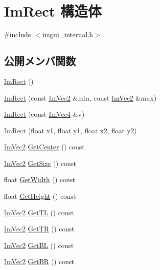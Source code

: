 \hypertarget{struct_im_rect}{}\section{Im\+Rect 構造体}
\label{struct_im_rect}


{\ttfamily \#include $<$imgui\+\_\+internal.\+h$>$}

\subsection*{公開メンバ関数}
\begin{DoxyCompactItemize}
\item 
\mbox{\hyperlink{struct_im_rect_a57399f36758ed3eb1eb762143401ff54}{Im\+Rect}} ()
\item 
\mbox{\hyperlink{struct_im_rect_a2f0ff273434bfd9d22bb699fd7a63a1f}{Im\+Rect}} (const \mbox{\hyperlink{struct_im_vec2}{Im\+Vec2}} \&min, const \mbox{\hyperlink{struct_im_vec2}{Im\+Vec2}} \&max)
\item 
\mbox{\hyperlink{struct_im_rect_adfe8d43381f9af8a3e3ea32a3821ab84}{Im\+Rect}} (const \mbox{\hyperlink{struct_im_vec4}{Im\+Vec4}} \&v)
\item 
\mbox{\hyperlink{struct_im_rect_a4cd168f1ae088e15db64b95b880f8933}{Im\+Rect}} (float x1, float y1, float x2, float y2)
\item 
\mbox{\hyperlink{struct_im_vec2}{Im\+Vec2}} \mbox{\hyperlink{struct_im_rect_aae13f8003184fd84f29d27c3c074cf43}{Get\+Center}} () const
\item 
\mbox{\hyperlink{struct_im_vec2}{Im\+Vec2}} \mbox{\hyperlink{struct_im_rect_ae459d9c50003058cfb34519a571aaf33}{Get\+Size}} () const
\item 
float \mbox{\hyperlink{struct_im_rect_afa75cb8491f20901c96166d17dcddac4}{Get\+Width}} () const
\item 
float \mbox{\hyperlink{struct_im_rect_a748d8ae9cb26508951ec6e2f2df0625b}{Get\+Height}} () const
\item 
\mbox{\hyperlink{struct_im_vec2}{Im\+Vec2}} \mbox{\hyperlink{struct_im_rect_a1d4d972329722b51dca4499cb5931b4b}{Get\+TL}} () const
\item 
\mbox{\hyperlink{struct_im_vec2}{Im\+Vec2}} \mbox{\hyperlink{struct_im_rect_acae90248a96be4acf1524071fca1c3f3}{Get\+TR}} () const
\item 
\mbox{\hyperlink{struct_im_vec2}{Im\+Vec2}} \mbox{\hyperlink{struct_im_rect_a59d9751bc7be6745dddf5b83b9155669}{Get\+BL}} () const
\item 
\mbox{\hyperlink{struct_im_vec2}{Im\+Vec2}} \mbox{\hyperlink{struct_im_rect_ad2f2687254beed5a9b19bde0d6fa14f5}{Get\+BR}} () const

\end{DoxyCompactItemize}
